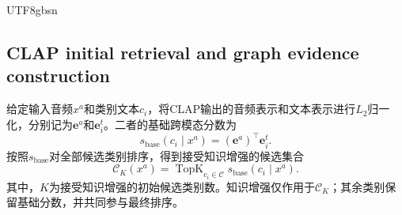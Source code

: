 \begin{CJK*}{UTF8}{gbsn}
\par\smallskip\noindent\begin{minipage}{\columnwidth}
\end{minipage}\par\smallskip

\subsection{CLAP initial retrieval and graph evidence construction}\label{sec:initial-retrieval}

给定输入音频$x^a$和类别文本$c_i$，将CLAP输出的音频表示和文本表示进行$L_2$归一化，分别记为$\mathbf e^a$和$\mathbf e_i^t$。二者的基础跨模态分数为
\begin{equation}
s_{\mathrm{base}}(c_i\mid x^a)=(\mathbf e^a)^\top\mathbf e_i^t.
\label{eq:base-score}
\end{equation}
按照$s_{\mathrm{base}}$对全部候选类别排序，得到接受知识增强的候选集合
\begin{equation}
\mathcal C_K(x^a)=\operatorname{TopK}_{c_i\in\mathcal C}s_{\mathrm{base}}(c_i\mid x^a).
\label{eq:topk}
\end{equation}
其中，$K$为接受知识增强的初始候选类别数。知识增强仅作用于$\mathcal C_K$；其余类别保留基础分数，并共同参与最终排序。


\end{CJK*}
